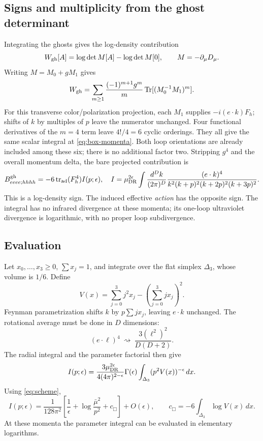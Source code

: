 \documentclass[11pt]{article}
\newcommand{\tr}{\operatorname{tr}}
\newcommand{\Tr}{\operatorname{Tr}}
\newcommand{\ad}{\operatorname{ad}}
\begin{document}
\subsection{Signs and multiplicity from the ghost determinant}

Integrating the ghosts gives the log-density contribution
\begin{equation}\label{eq:det}
 W_{\rm gh}[A]=\log\det M[A]-\log\det M[0],\qquad M=-\partial_\mu D_\mu.
\end{equation}
Writing $M=M_0+gM_1$ gives
\[
 W_{\rm gh}=\sum_{m\ge1}\frac{(-1)^{m+1}g^m}{m}
 \Tr[(M_0^{-1}M_1)^m].
\]
For this transverse color/polarization projection, each $M_1$ supplies
$-i(e\cdot k)F_h$; shifts of $k$ by multiples of $p$ leave the numerator
unchanged. Four functional derivatives of the $m=4$ term leave
$4!/4=6$ cyclic orderings. They all give the same scalar integral at
\eqref{eq:box-momenta}. Both loop orientations are already included among
these six; there is no additional factor two. Stripping $g^4$ and the
overall momentum delta, the bare projected contribution is
\begin{equation}\label{eq:box-prefactor}
 B^{\rm gh}_{eeee;hhhh}=-6\tr_{\ad}(F_h^4)I(p;\epsilon),
 \quad
 I=\mu_{\rm DR}^{2\epsilon}\int\frac{d^Dk}{(2\pi)^D}
 \frac{(e\cdot k)^4}{k^2(k+p)^2(k+2p)^2(k+3p)^2}.
\end{equation}
This is a log-density sign. The induced effective \emph{action} has the
opposite sign. The integral has no infrared divergence at these momenta;
its one-loop ultraviolet divergence is logarithmic, with no proper loop
subdivergence.

\subsection{Evaluation}

Let $x_0,\ldots,x_3\ge0$, $\sum x_j=1$, and integrate over the flat simplex
$\Delta_3$, whose volume is $1/6$. Define
\[
 V(x)=\sum_{j=0}^3j^2x_j-\left(\sum_{j=0}^3jx_j\right)^2.
\]
Feynman parametrization shifts $k$ by $p\sum jx_j$, leaving $e\cdot k$
unchanged. The rotational average must be done in $D$ dimensions:
\[
 (e\cdot\ell)^4\ \rightsquigarrow\
 \frac{3(\ell^2)^2}{D(D+2)}.
\]
The radial integral and the parameter factorial then give
\begin{equation}\label{eq:box-param}
 I(p;\epsilon)=\frac{3\mu_{\rm DR}^{2\epsilon}}{4(4\pi)^{2-\epsilon}}
 \Gamma(\epsilon)\int_{\Delta_3}(p^2V(x))^{-\epsilon}\,dx.
\end{equation}
Using \eqref{eq:scheme},
\begin{equation}\label{eq:box-expanded}
 I(p;\epsilon)=\frac1{128\pi^2}
 \left[\frac1\epsilon+\log\frac{\bar\mu^2}{p^2}+c_\Box\right]+O(\epsilon),
 \qquad c_\Box=-6\int_{\Delta_3}\log V(x)\,dx.
\end{equation}
At these momenta the parameter integral can be evaluated in elementary
logarithms.
\end{document}
